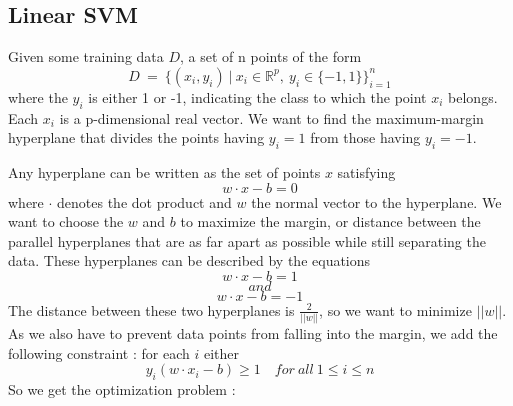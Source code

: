 \subsection{Linear SVM}

Given some training data $D$, a set of n points of the form \[D\ =\ \{(x_{i},y_{i})\ |\ x_{i} \in \mathbb{R}^{p},\ y_{i} \in \{-1,1\}\}^{n}_{i=1}\] where the \begin{math}y_{i}\end{math}
is either 1 or -1, indicating the class to which the point \begin{math}x_{i}\end{math} belongs. Each \begin{math}x_{i}\end{math} is a p-dimensional real vector. 
We want to find the maximum-margin hyperplane that divides the points having \begin{math}y_{i}=1\end{math} from those having \begin{math}y_{i}=-1\end{math}.


Any hyperplane can be written as the set of points \begin{math}x\end{math} satisfying \[w \cdot x - b = 0\] where \begin{math}\cdot\end{math} denotes the dot product and \begin{math}w\end{math} the normal vector
to the hyperplane. We want to choose the \begin{math}w\end{math} and \begin{math}b\end{math} to maximize the margin, or distance between the parallel hyperplanes that are as far apart as possible while still separating the data. These hyperplanes can be
described by the equations \[w \cdot x - b = 1\] \[and\] \[w \cdot x - b = -1\]
The distance between these two hyperplanes is \begin{math}\frac{2}{||w||}\end{math}, so we want to minimize \begin{math}||w||\end{math}. As we also have to prevent data points from falling into the margin, we add the following constraint : for each $i$ either
\begin{equation}y_{i}(w \cdot x_{i} - b)\geq 1\quad for\ all\ 1\leq i\leq n\end{equation}
\newpage
So we get the optimization problem :


